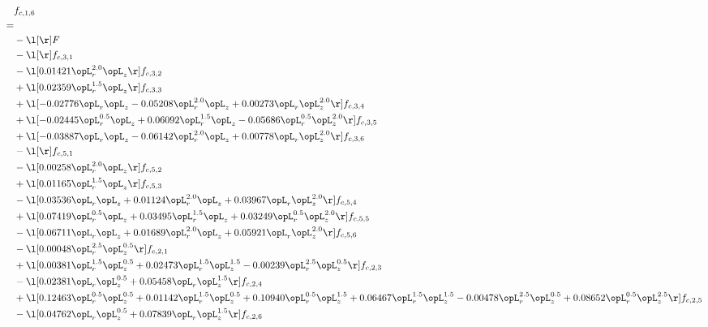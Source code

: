 \begin{alignat}{2} 
\label{eq:f_16_2} 
& f_{c,1,6} \nonumber \\ 
 = \\ 
& - \l[  \r] F \nonumber \\ 
& - \l[  \r] f_{c,3,1} \nonumber \\ 
& - \l[  0.01421 \opL_r^{2.0} \opL_z  \r] f_{c,3,2} \nonumber \\ 
& + \l[  0.02359 \opL_r^{1.5} \opL_z  \r] f_{c,3,3} \nonumber \\ 
& + \l[  -0.02776 \opL_r \opL_z   -0.05208 \opL_r^{2.0} \opL_z +  0.00273 \opL_r \opL_z^{2.0}  \r] f_{c,3,4} \nonumber \\ 
& + \l[  -0.02445 \opL_r^{0.5} \opL_z +  0.06092 \opL_r^{1.5} \opL_z   -0.05686 \opL_r^{0.5} \opL_z^{2.0}  \r] f_{c,3,5} \nonumber \\ 
& + \l[  -0.03887 \opL_r \opL_z   -0.06142 \opL_r^{2.0} \opL_z +  0.00778 \opL_r \opL_z^{2.0}  \r] f_{c,3,6} \nonumber \\ 
& - \l[  \r] f_{c,5,1} \nonumber \\ 
& - \l[  0.00258 \opL_r^{2.0} \opL_z  \r] f_{c,5,2} \nonumber \\ 
& + \l[  0.01165 \opL_r^{1.5} \opL_z  \r] f_{c,5,3} \nonumber \\ 
& - \l[  0.03536 \opL_r \opL_z +  0.01124 \opL_r^{2.0} \opL_z +  0.03967 \opL_r \opL_z^{2.0}  \r] f_{c,5,4} \nonumber \\ 
& + \l[  0.07419 \opL_r^{0.5} \opL_z +  0.03495 \opL_r^{1.5} \opL_z +  0.03249 \opL_r^{0.5} \opL_z^{2.0}  \r] f_{c,5,5} \nonumber \\ 
& - \l[  0.06711 \opL_r \opL_z +  0.01689 \opL_r^{2.0} \opL_z +  0.05921 \opL_r \opL_z^{2.0}  \r] f_{c,5,6} \nonumber \\ 
& - \l[  0.00048 \opL_r^{2.5} \opL_z^{0.5}  \r] f_{c,2,1} \nonumber \\ 
& + \l[  0.00381 \opL_r^{1.5} \opL_z^{0.5} +  0.02473 \opL_r^{1.5} \opL_z^{1.5}   -0.00239 \opL_r^{2.5} \opL_z^{0.5}  \r] f_{c,2,3} \nonumber \\ 
& - \l[  0.02381 \opL_r \opL_z^{0.5} +  0.05458 \opL_r \opL_z^{1.5}  \r] f_{c,2,4} \nonumber \\ 
& + \l[  0.12463 \opL_r^{0.5} \opL_z^{0.5} +  0.01142 \opL_r^{1.5} \opL_z^{0.5} +  0.10940 \opL_r^{0.5} \opL_z^{1.5} +  0.06467 \opL_r^{1.5} \opL_z^{1.5}   -0.00478 \opL_r^{2.5} \opL_z^{0.5} +  0.08652 \opL_r^{0.5} \opL_z^{2.5}  \r] f_{c,2,5} \nonumber \\ 
& - \l[  0.04762 \opL_r \opL_z^{0.5} +  0.07839 \opL_r \opL_z^{1.5}  \r] f_{c,2,6} \nonumber \\ 

\end{alignat}
